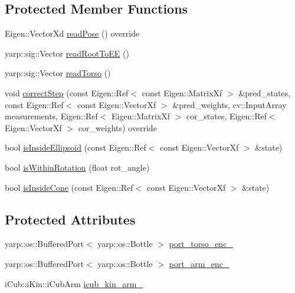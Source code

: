 \subsection*{Protected Member Functions}
\begin{DoxyCompactItemize}
\item 
Eigen\+::\+Vector\+Xd \hyperlink{classPlayGatePose_a863afa00ea83395e7f2ceffd26242106}{read\+Pose} () override
\item 
yarp\+::sig\+::\+Vector \hyperlink{classPlayGatePose_aa9304fb7f500dc947d5e2b5687fa2caf}{read\+Root\+To\+EE} ()
\item 
yarp\+::sig\+::\+Vector \hyperlink{classPlayGatePose_a9df2350244234bbd6cd3e32d2592eca4}{read\+Torso} ()
\item 
void \hyperlink{classGatePose_a91d395abe75dc7772116f50219dc19ae}{correct\+Step} (const Eigen\+::\+Ref$<$ const Eigen\+::\+Matrix\+Xf $>$ \&pred\+\_\+states, const Eigen\+::\+Ref$<$ const Eigen\+::\+Vector\+Xf $>$ \&pred\+\_\+weights, cv\+::\+Input\+Array measurements, Eigen\+::\+Ref$<$ Eigen\+::\+Matrix\+Xf $>$ cor\+\_\+states, Eigen\+::\+Ref$<$ Eigen\+::\+Vector\+Xf $>$ cor\+\_\+weights) override
\item 
bool \hyperlink{classGatePose_a880273787b1b3542e1e7971954ac118d}{is\+Inside\+Ellipsoid} (const Eigen\+::\+Ref$<$ const Eigen\+::\+Vector\+Xf $>$ \&state)
\item 
bool \hyperlink{classGatePose_a6d188756ed5dcc56c311a2aafc9d1acd}{is\+Within\+Rotation} (float rot\+\_\+angle)
\item 
bool \hyperlink{classGatePose_ad2e8708b3ed5a8252bdec1494f199fda}{is\+Inside\+Cone} (const Eigen\+::\+Ref$<$ const Eigen\+::\+Vector\+Xf $>$ \&state)
\end{DoxyCompactItemize}
\subsection*{Protected Attributes}
\begin{DoxyCompactItemize}
\item 
yarp\+::os\+::\+Buffered\+Port$<$ yarp\+::os\+::\+Bottle $>$ \hyperlink{classPlayGatePose_a95364e89c1f231c8f1c6c446c59c60a1}{port\+\_\+torso\+\_\+enc\+\_\+}
\item 
yarp\+::os\+::\+Buffered\+Port$<$ yarp\+::os\+::\+Bottle $>$ \hyperlink{classPlayGatePose_a5ca90c285338480d1107dafff024ffa6}{port\+\_\+arm\+\_\+enc\+\_\+}
\item 
i\+Cub\+::i\+Kin\+::i\+Cub\+Arm \hyperlink{classPlayGatePose_aa108b754575bdc988508a78c779de9da}{icub\+\_\+kin\+\_\+arm\+\_\+}
\end{DoxyCompactItemize}
